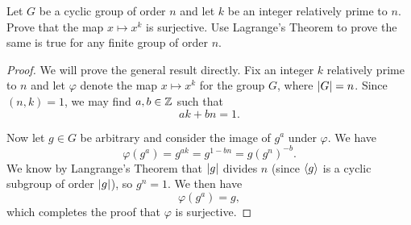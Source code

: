  Let $G$ be a cyclic group of order $n$ and let $k$ be an
integer relatively prime to $n$. Prove that the map $x\mapsto x^k$ is
surjective. Use Lagrange's Theorem to prove the same is true for any
finite group of order $n$.
\begin{proof}
  We will prove the general result directly. Fix an integer $k$
  relatively prime to $n$ and let $\varphi$ denote the map
  $x\mapsto x^k$ for the group $G$, where $\lvert{G}\rvert = n$. Since
  $(n,k) = 1$, we may find $a,b\in\mathbb{Z}$ such that
  \begin{equation*}
    ak + bn = 1.
  \end{equation*}

  Now let $g\in G$ be arbitrary and consider the image of $g^a$ under
  $\varphi$. We have
  \begin{equation*}
    \varphi(g^a) = g^{ak} = g^{1 - bn} = g(g^n)^{-b}.
  \end{equation*}
  We know by Langrange's Theorem that $\lvert{g}\rvert$ divides $n$ (since
  $\langle{g}\rangle$ is a cyclic subgroup of order $\lvert{g}\rvert$), so $g^n =
  1$. We then have
  \begin{equation*}
    \varphi(g^a) = g,
  \end{equation*}
  which completes the proof that $\varphi$ is surjective.
\end{proof}

